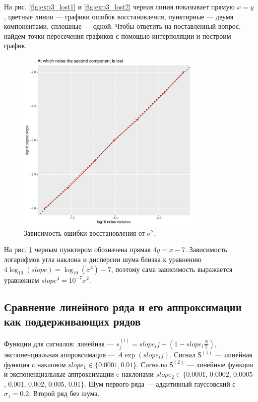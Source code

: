 \documentclass[specialist, substylefile = spbureport.rtx,
    subf,href,colorlinks=true, 12pt]{disser}
\newcommand{\sfS}{\mathsf{S}}
\begin{document}
        На рис. \ref{fig:exp3_lost1} и \ref{fig:exp3_lost2} черная линия показывает прямую $x = y$, цветные линии --- графики ошибок восстановления, пунктирные --- двумя компонентами, сплошные --- одной. Чтобы ответить на поставленный вопрос, найдем точки пересечения графиков с помощью интерполяции и построим график.

        \begin{figure}[h]
            \centering
            \includegraphics[width=0.8\textwidth]{experiment_3_lost3.pdf}
            \caption{Зависимость ошибки восстановления от $\sigma^2$.}
            \label{fig:exp3_lost3}
        \end{figure}

        На рис. \ref{fig:exp3_lost3} черным пунктиром обозначена прямая $4y = x - 7$. Зависимость логарифмов угла наклона и дисперсии шума близка к уравнению $4\log_{10}(slope) = \log_{10}(\sigma^2) - 7$, поэтому сама зависимость выражается уравнением $slope^4 = 10^{-7}\sigma^2$.

    \subsection{Сравнение линейного ряда и его аппроксимации как поддерживающих рядов}
        Функции для сигналов: линейная --- $s^{(i)}_j = slope_i j+(1-slope_i\frac{N}{2})$, экспоненциальная аппроксимация --- $A \exp(slope_i j)$.
        Сигнал $\sfS^{(1)}$ --- линейная функция c наклоном $slope_1 \in \{0.0001, 0.01\}$.
        Сигналы $\sfS^{(2)}$ --- линейные функции и экспоненциальные аппроксимации c наклонами $slope_2 \in \{0.0001$, $0.0002$, $0.0005$, $0.001$, $0.002$, $0.005$, $0.01\}$. Шум первого ряда --- аддитивный гауссовский с $\sigma_1 = 0.2$. Второй ряд без шума.
\end{document}
